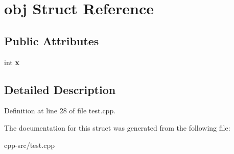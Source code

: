 \hypertarget{structobj}{\section{obj Struct Reference}
\label{structobj}
}
\subsection*{Public Attributes}
\begin{DoxyCompactItemize}
\item 
\hypertarget{structobj_a5cfeed72115b89b62cf4cbc230c129ea}{int {\bfseries x}}\label{structobj_a5cfeed72115b89b62cf4cbc230c129ea}

\end{DoxyCompactItemize}


\subsection{Detailed Description}


Definition at line 28 of file test.\-cpp.



The documentation for this struct was generated from the following file\-:\begin{DoxyCompactItemize}
\item 
cpp-\/src/test.\-cpp\end{DoxyCompactItemize}
